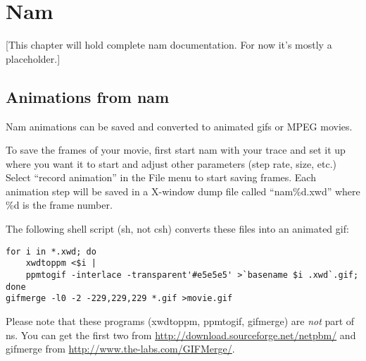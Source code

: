
\chapter{Nam}
	\label{chap:nam}

[This chapter will hold complete nam documentation.
For now it's mostly a placeholder.]

%
% 

\section{Animations from nam}

Nam animations can be saved and converted to animated gifs or MPEG movies.

To save the frames of your movie, first
  start nam with your trace and set it up where you want it to start
  and adjust other parameters (step rate, size, etc.)
Select ``record animation'' in the File menu to start saving frames.
Each animation step will be saved in a X-window dump file called ``nam\%d.xwd''
  where \%d is the frame number.

The following shell script (sh, not csh)
  converts these files into an animated gif:
\begin{verbatim}
for i in *.xwd; do
	xwdtoppm <$i |
	ppmtogif -interlace -transparent'#e5e5e5' >`basename $i .xwd`.gif;
done
gifmerge -l0 -2 -229,229,229 *.gif >movie.gif
\end{verbatim}

Please note that these programs (xwdtoppm, ppmtogif, gifmerge)
  are \emph{not} part of ns.
You can get the first two from \url{http://download.sourceforge.net/netpbm/}
  and gifmerge from \url{http://www.the-labs.com/GIFMerge/}.


